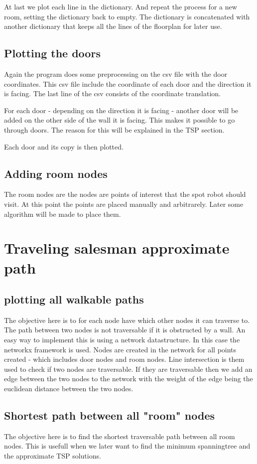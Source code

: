 At last we plot each line in the dictionary.
And repeat the process for a new room, setting the dictionary back to empty. The dictionary is concatenated with another dictionary that keeps all the lines of the floorplan for later use.


\subsection{Plotting the doors}
Again the program does some preprocessing on the csv file with the door coordinates. This csv file include the coordinate of each door and the direction it is facing. The last line of the csv consists of the coordinate translation.

For each door - depending on the direction it is facing - another door will be added on the other side of the wall it is facing. This makes it possible to go through doors. The reason for this will be explained in the TSP section.

Each door and its copy is then plotted.

\subsection{Adding room nodes}
The room nodes are the nodes are points of interest that the spot robot should visit. At this point the points are placed manually and arbitrarely. Later some algorithm will be made to place them.

\section{Traveling salesman approximate path}
\subsection{plotting all walkable paths}
The objective here is to for each node have which other nodes it can traverse to. The path between two nodes is not traversable if it is obstructed by a wall. 
An easy way to implement this is using a network datastructure. In this case the networkx framework is used. Nodes are created in the network for all points created - which includes door nodes and room nodes. 
Line intersection is them used to check if two nodes are traversable.
If they are traversable then we add an edge between the two nodes to the network with the weight of the edge being the euclidean distance between the two nodes.


\subsection{Shortest path between all "room" nodes}
The objective here is to find the shortest traversable path between all room nodes. This is usefull when we later want to find the minimum spanningtree and the approximate TSP solutions.

